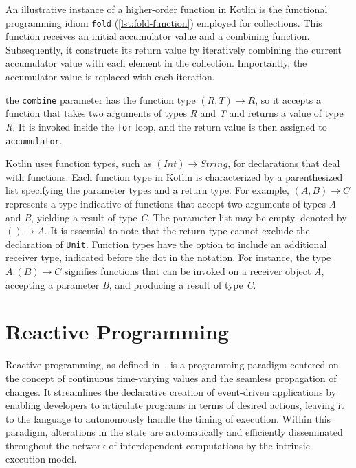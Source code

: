 \documentclass[12pt,a4paper,openright,twoside]{book}
\begin{document}
An illustrative instance of a higher-order function in Kotlin is the functional programming idiom \texttt{fold} (\cref{lst:fold-function})
employed for collections. This function receives an initial accumulator value and a combining function. Subsequently, it constructs its return value by iteratively combining the current accumulator value with each element in the collection. Importantly, the accumulator value is replaced with each iteration.



the \texttt{combine} parameter has the function type \((R, T) \rightarrow R\), so it accepts a function that takes two arguments of types \textit{R} and \textit{T} and returns a value of type \textit{R}. It is invoked inside the \texttt{for} loop, and the return value is then assigned to \texttt{accumulator}.

Kotlin uses function types, such as \((Int) \rightarrow String\), for declarations that deal with functions. Each function type in Kotlin is characterized by a parenthesized list specifying the parameter types and a return type. For example, \((A, B) \rightarrow C\) represents a type indicative of functions that accept two arguments of types \textit{A} and \textit{B}, yielding a result of type \textit{C}. The parameter list may be empty, denoted by \(() \rightarrow A\). It is essential to note that the return type cannot exclude the declaration of \texttt{Unit}. Function types have the option to include an additional receiver type, indicated before the dot in the notation. For instance, the type \(A.(B) \rightarrow C\) signifies functions that can be invoked on a receiver object \textit{A}, accepting a parameter \textit{B}, and producing a result of type \textit{C}.

\section{Reactive Programming}

Reactive programming, as defined in~\cite{Bainomugisha2013}, is a programming paradigm centered on the concept of continuous time-varying values and the seamless propagation of changes. It streamlines the declarative creation of event-driven applications by enabling developers to articulate programs in terms of desired actions, leaving it to the language to autonomously handle the timing of execution. Within this paradigm, alterations in the state are automatically and efficiently disseminated throughout the network of interdependent computations by the intrinsic execution model.
\end{document}
